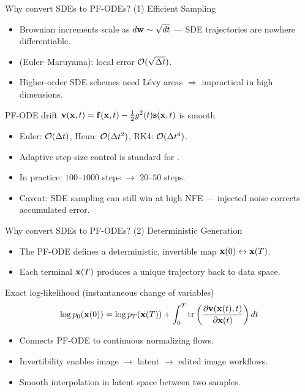 \documentclass{beamer}
\renewcommand{\eqpause}{}
\begin{document}
\begin{frame}{Why convert SDEs to PF-ODEs? (1) Efficient Sampling}
	\begin{itemize}
		\item Brownian increments scale as $d\mathbf{w} \sim \sqrt{dt}$ — SDE trajectories are nowhere differentiable.
		\item \SDESolve (Euler–Maruyama): local error $\mathcal{O}(\sqrt{\Delta t})$.
		\item Higher-order SDE schemes need Lévy areas $\Rightarrow$ impractical in high dimensions.
	\end{itemize}
	\eqpause
	\begin{block}{PF-ODE drift $\mathbf{v}(\mathbf{x}, t) = \mathbf{f}(\mathbf{x}, t) - \frac{1}{2} g^2(t) \mathbf{s}(\mathbf{x}, t)$ is smooth}
		\begin{itemize}
			\item Euler: $\mathcal{O}(\Delta t)$, \quad Heun: $\mathcal{O}(\Delta t^2)$, \quad RK4: $\mathcal{O}(\Delta t^4)$.
			\item Adaptive step-size control is standard for \ODESolve.
		\end{itemize}
	\end{block}
	\eqpause
	\begin{itemize}
		\item In practice: $100$--$1000$ \SDESolve steps $\to$ $20$--$50$ \ODESolve steps.
		\item Caveat: SDE sampling can still win at high NFE — injected noise corrects accumulated error.
	\end{itemize}
\end{frame}
\begin{frame}{Why convert SDEs to PF-ODEs? (2) Deterministic Generation}
	\begin{itemize}
		\item The PF-ODE defines a deterministic, invertible map $\mathbf{x}(0) \leftrightarrow \mathbf{x}(T)$.
		\item Each terminal $\mathbf{x}(T)$ produces a unique trajectory back to data space.
	\end{itemize}
	\eqpause
	\begin{block}{Exact log-likelihood (instantaneous change of variables)}
		\vspace{-0.3cm}
		\[
			\log p_0(\mathbf{x}(0)) = \log p_T(\mathbf{x}(T)) + \int_0^T \operatorname{tr}\left(\frac{\partial \mathbf{v}(\mathbf{x}(t), t)}{\partial \mathbf{x}(t)}\right) dt
		\]
	\end{block}
	\eqpause
	\begin{itemize}
		\item Connects PF-ODE to continuous normalizing flows.
		\item Invertibility enables image $\to$ latent $\to$ edited image workflows.
		\item Smooth interpolation in latent space between two samples.
	\end{itemize}
\end{frame}
\end{document}
